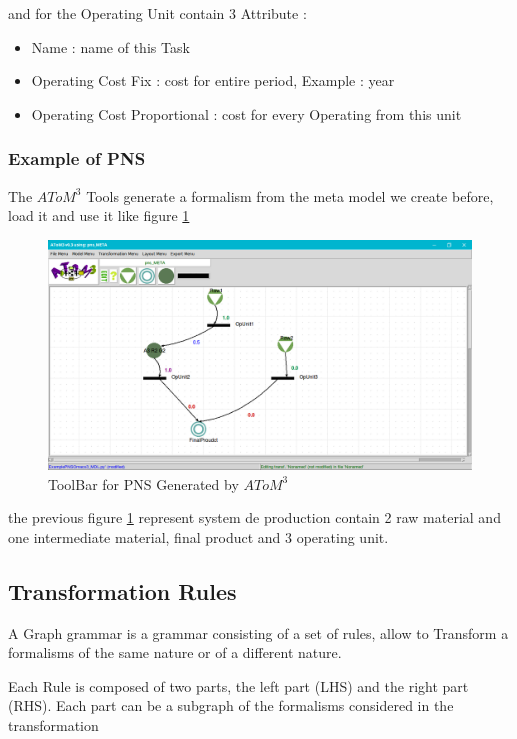 and for the Operating Unit contain 3 Attribute : 
\begin{itemize}

\item Name : name of this Task 
\item Operating Cost Fix  : cost for entire period, Example : year
\item Operating Cost Proportional  :  cost for every Operating from this unit

\end{itemize}


\subsubsection{Example of PNS}
The  $AToM^3$ Tools  generate a formalism from the meta model we create before, load it and use it like figure \ref{fig:PNS Model} 

\begin{figure}[th]
	\centering
 	\includegraphics[scale=0.3]{ch3/img/pns_model}
	\caption{\label{fig:PNS Model}ToolBar for PNS Generated by $AToM^3$}
\end{figure} 

the previous figure \ref{fig:PNS Model} represent system de production contain 2 raw material and one intermediate material, final product and 3 operating unit.





\pagebreak
\subsection{Transformation Rules}
A Graph grammar is a grammar consisting of a set of rules, allow to 
Transform a formalisms of the same nature or of a different nature. 

Each Rule is composed of two parts, the left part (LHS) and the right part (RHS).
Each part can be a subgraph of the formalisms considered in the transformation

